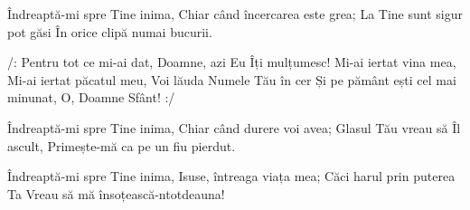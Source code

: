 \beginverse
Îndreaptă-mi spre Tine inima,
Chiar când încercarea este grea;
La Tine sunt sigur pot găsi
În orice clipă numai bucurii.
\endverse

\beginchorus
/: Pentru tot ce mi-ai dat, Doamne, azi
Eu Îți mulțumesc!
Mi-ai iertat vina mea,
Mi-ai iertat păcatul meu,
Voi lăuda Numele Tău în cer
Și pe pământ ești cel mai minunat,
O, Doamne Sfânt! :/
\endchorus

\beginverse
Îndreaptă-mi spre Tine inima,
Chiar când durere voi avea;
Glasul Tău vreau să Îl ascult,
Primește-mă ca pe un fiu pierdut.
\endverse

\beginverse
Îndreaptă-mi spre Tine inima,
Isuse, întreaga viața mea;
Căci harul prin puterea Ta
Vreau să mă însoțească-ntotdeauna!
\endverse
\endsong